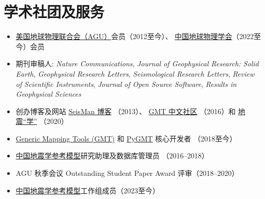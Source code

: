 \section{学术社团及服务}

\begin{itemize}
\item \href{https://sites.agu.org/}{美国地球物理联合会（AGU）}会员（2012至今）、
      \href{http://www.cgscgs.org.cn/}{中国地球物理学会}（2022至今）会员
\item 期刊审稿人:
      \emph{Nature Communications},
      \emph{Journal of Geophysical Research: Solid Earth},
      \emph{Geophysical Research Letters},
      \emph{Seismological Research Letters},
      \emph{Review of Scientific Instruments},
      \emph{Journal of Open Source Software},
      \emph{Results in Geophysical Sciences}
\item 创办博客及网站
      \href{https://blog.seisman.info}{SeisMan 博客} （2013）、
      \href{http://gmt-china.org/}{GMT 中文社区} （2016）和
      \href{https://seismo-learn.org/}{地震``学''} （2020）
\item \href{https://github.com/GenericMappingTools/gmt}{Generic Mapping Tools (GMT)} 和
      \href{https://github.com/GenericMappingTools/pygmt}{PyGMT} 核心开发者 （2018至今）
\item \href{http://chinageorefmodel.org/}{中国地震学参考模型}研究助理及数据库管理员 （2016--2018）
\item AGU 秋季会议 Outstanding Student Paper Award 评审（2018--2020）
\item \href{http://chinageorefmodel.org/}{中国地震学参考模型}工作组成员（2023至今）
\end{itemize}
